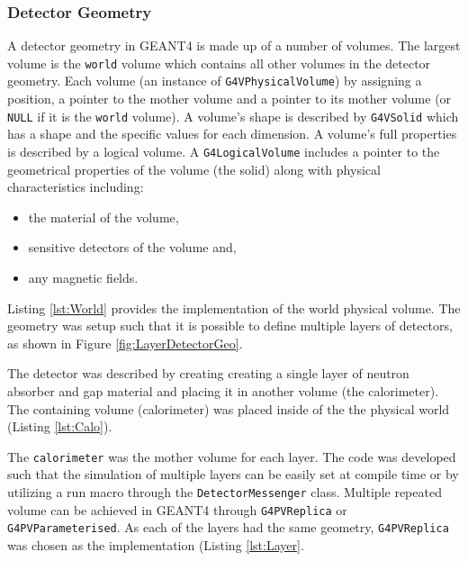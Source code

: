 \subsubsection{Detector Geometry}
A detector geometry in GEANT4 is made up of a number of volumes.
The largest volume is the \verb+world+ volume which contains all other volumes in the detector geometry.
Each volume (an instance of \verb+G4VPhysicalVolume+) by assigning a position, a pointer to the mother volume and a pointer to its mother volume (or \verb+NULL+ if it is the \verb+world+ volume).
A volume's shape is described by \verb+G4VSolid+ which has a shape and the specific values for each dimension.
A volume's full properties is described by a logical volume.
A \verb+G4LogicalVolume+ includes a pointer to the geometrical properties of the volume (the solid) along with physical characteristics including:
\begin{itemize}
    \item the material of the volume,
    \item sensitive detectors of the volume and,
    \item any magnetic fields.
\end{itemize}
Listing \ref{lst:World} provides the implementation of the world physical volume.
The geometry was setup such that it is possible to define multiple layers of detectors, as shown in Figure \ref{fig:LayerDetectorGeo}.

The detector was described by creating creating a single layer of neutron absorber and gap material and placing it in another volume (the calorimeter).
The containing volume (calorimeter) was placed inside of the the physical world (Listing \ref{lst:Calo}).

The \verb+calorimeter+ was the mother volume for each layer. 
The code was developed such that the simulation of multiple layers can be easily set at compile time or by utilizing a run macro through the \verb+DetectorMessenger+ class.
Multiple repeated volume can be achieved in GEANT4 through \verb+G4PVReplica+ or \verb+G4PVParameterised+.
As each of the layers had the same geometry, \verb+G4PVReplica+ was chosen as the implementation (Listing \ref{lst:Layer}.

